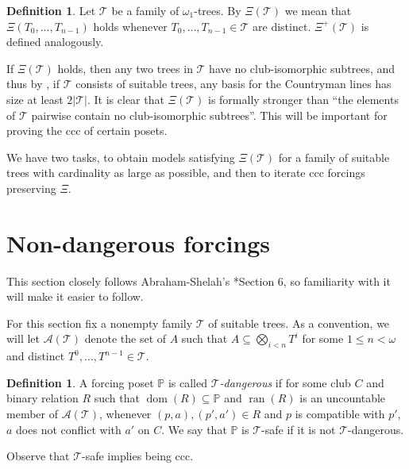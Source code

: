 \documentclass[a4paper,noamsfonts]{amsart}
\theoremstyle{definition}
\newtheorem{definition}[theorem]{Definition}
\renewcommand{\P}{\mathbb {P}}
\newcommand{\seb}{\subseteq}
\newcommand{\1}{\mathbf{1}}
\newcommand{\T}{\mathcal{T}}
\newcommand{\prop}{\Xi}
\newcommand{\propp}{\prop^{+}}
\DeclareMathOperator{\dom}{dom}
\DeclareMathOperator{\ran}{ran}
\begin{document}
\begin{definition}
  Let $\T$ be a family of $\omega_{1}$-trees. By $\prop(\T)$ we mean
  that $\prop(T_{0},\dots,T_{n-1})$ holds whenever $T_{0},\dots,T_{n-1} \in \T$
  are distinct. $\propp(\T)$ is defined analogously.
\end{definition}

If $\prop(\T)$ holds, then any two trees in $\T$ have no club-isomorphic
subtrees, and thus by , if $\T$
consists of suitable trees, any basis for
the Countryman lines has size at least $2|\T|$. It is clear that
$\prop(\T)$ is formally stronger than ``the elements of $\T$ pairwise contain
no club-isomorphic subtrees''. This will be important for
proving the ccc of certain posets.

We have two tasks, to obtain models satisfying $\prop(\T)$ for a family of
suitable trees with cardinality as large as possible, and then
to iterate ccc forcings preserving $\prop$. 



\section{Non-dangerous forcings}\label{sec:non-dangerous}

This section closely follows Abraham-Shelah's \cite{ShelahAbraham}*{Section 6},
so familiarity with it will make it easier to follow.

For this section fix a nonempty family $\T$ of suitable trees.
As a convention, we will let $\mathcal{A}(\T)$
denote the set of $A$ such that $A \seb \bigotimes_{i <
  n}T^{i}$ for some $1 \le n < \omega$ and distinct
$T^{0},\dots,T^{n-1}\in \T$.

\begin{definition}\label{df:safe}
  A forcing poset $\P$ is called
  \emph{$\T$-dangerous} if for some club $C$ and
  binary relation $R$ such that
  $\dom(R) \seb \P$ and $\ran(R)$ is an uncountable
  member of $\mathcal{A}(\T)$,
  whenever $(p,a),(p',a') \in R$ and $p$ is compatible
  with $p'$, $a$ does not conflict with $a'$ on $C$.
  We say that $\P$ is $\T$-safe if it is not $\T$-dangerous.
\end{definition}

Observe that $\T$-safe implies being ccc.
\end{document}
